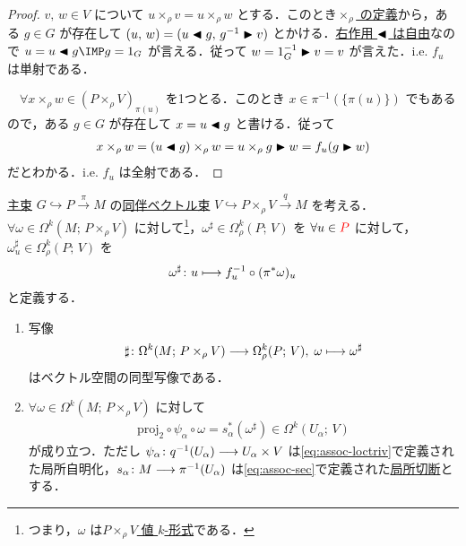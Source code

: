 \documentclass[TQFT_main]{subfiles}
\begin{document}
\begin{proof}
    $v,\, w \in V$ について $u \times_\rho v = u \times_\rho w$ とする．このとき\hyperref[prop:Borelconst]{$\times_\rho$ の定義}から，ある $g \in G$ が存在して $(u,\, w) = (u \blacktriangleleft g,\, g^{-1} \blacktriangleright v)$ とかける．\hyperref[prop.PFD_right]{右作用 $\blacktriangleleft$ は自由}なので $u = u \btl g \IMP g = 1_G$ が言える．従って $w = 1_G^{-1} \blacktriangleright v = v$ が言えた．i.e. $f_u$ は単射である．

    　$\forall x \times_\rho w \in (P \times_\rho V)_{\pi(u)}$ を1つとる．このとき $x \in \pi^{-1}(\{\pi(u)\})$ でもあるので，ある $g \in G$ が存在して $x = u \blacktriangleleft g$ と書ける．従って
    \begin{align}
        x \times_\rho w = (u \blacktriangleleft g) \times_\rho w = u \times_\rho g \blacktriangleright w = f_u(g \blacktriangleright w)
    \end{align}
    だとわかる．i.e. $f_u$ は全射である．
\end{proof}

\begin{myprop}[label=prop:assoc-basic]{}
    \hyperref[def.PFD]{主束} $G \hookrightarrow P \xrightarrow{\pi} M$ の\hyperref[def:associated-vect]{同伴ベクトル束} $V \hookrightarrow P \times_\rho V \xrightarrow{q} M$ を考える．
    $\forall \omega \in \Omega^k (M;\, P \times_\rho V)$ に対して\footnote{つまり，$\omega$ は\hyperref[eq:E-valued]{$P \times_\rho V$ 値 $k$-形式}である．}，$\omega^\sharp \in \Omega^k_\rho(P;\, V)$ を
    $\forall u \in \textcolor{red}{P}$ に対して，$\omega_u^\sharp \in \Omega^k_\rho (P;\, V)$ を
    \begin{align}
        \omega^\sharp \colon u \longmapsto f_u^{-1} \circ (\pi^* \omega)_u
    \end{align}
    と定義する．
    \begin{enumerate}
        \item 写像
        \begin{align}
            \sharp \colon \Omega^k (M;\, P \times_\rho V) \longrightarrow \Omega^k_\rho(P;\, V),\; \omega \longmapsto \omega^\sharp    
        \end{align}
        はベクトル空間の同型写像である．
        \item 
        $\forall \omega \in \Omega^k (M;\, P \times_\rho V)$ に対して
        \begin{align}
            \mathrm{proj}_2 \circ \psi_\alpha \circ \omega = s_\alpha^* (\omega^\sharp) \in \Omega^k (U_\alpha;\, V)
        \end{align}
        が成り立つ．ただし $\psi_\alpha \colon q^{-1} (U_\alpha) \longrightarrow U_\alpha \times V$ は\eqref{eq:assoc-loctriv}で定義された局所自明化，$s_\alpha \colon M \longrightarrow \pi^{-1}(U_\alpha)$ は\eqref{eq:assoc-sec}で定義された\hyperref[def.section]{局所切断}とする．
    \end{enumerate}
\end{myprop}
\end{document}
